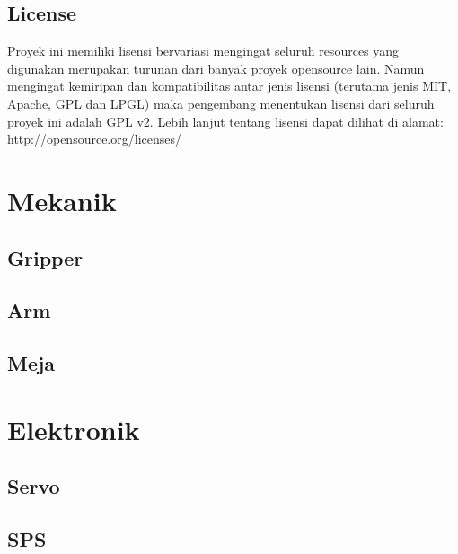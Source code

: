 \documentclass[11pt,fleqn]{book} %
\begin{document}
\section{License}
\hspace{10pt} Proyek ini memiliki lisensi bervariasi mengingat seluruh resources yang digunakan merupakan turunan dari banyak proyek opensource lain.
Namun mengingat kemiripan dan kompatibilitas antar jenis lisensi (terutama jenis MIT, Apache, GPL dan LPGL) maka pengembang menentukan lisensi dari seluruh proyek ini adalah GPL v2.
Lebih lanjut tentang lisensi dapat dilihat di alamat: \url{http://opensource.org/licenses/}

\newpage
{} %
\chapter{Mekanik}
\section{Gripper}

\section{Arm}

\section{Meja}

\newpage
{} %
\chapter{Elektronik}
\section{Servo}

\section{SPS}
\end{document}
